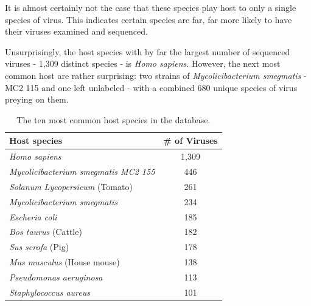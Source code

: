 \documentclass[12pt]{article}
\begin{document}
    It is almost certainly not the case that these species play host to only a
    single species of virus. This indicates certain species are far, far more likely
    to have their viruses examined and sequenced.

    Unsurprisingly, the host species with by far the largest number of
    sequenced viruses - 1,309 distinct species - is \emph{Homo sapiens}. However,
    the next most common host are rather surprising: two strains of 
    \emph{Mycolicibacterium smegmatis} - MC2 115 and one left unlabeled - with a
    combined 680 unique species of virus preying on them.

    \begin{table}[H]
        \begin{center}
            \begin{tabular}{|l||c|}
                \hline
                Host species                                 & \# of Viruses \\ \hline\hline
                \textit{Homo sapiens}                        & 1,309         \\ \hline
                \textit{Mycolicibacterium smegmatis MC2 155} & 446           \\ \hline
                \textit{Solanum Lycopersicum} (Tomato)       & 261           \\ \hline
                \textit{Mycolicibacterium smegmatis}         & 234           \\ \hline
                \textit{Escheria coli}                       & 185           \\ \hline
                \textit{Bos taurus} (Cattle)                 & 182           \\ \hline
                \textit{Sus scrofa} (Pig)                    & 178           \\ \hline
                \textit{Mus musculus} (House mouse)          & 138           \\ \hline
                \textit{Pseudomonas aeruginosa}              & 113           \\ \hline
                \textit{Staphylococcus aureus}               & 101           \\ \hline    
            \end{tabular}
            \caption{The ten most common host species in the database.}
            \label{most_common_hosts_table}
        \end{center}
    \end{table}
\end{document}
